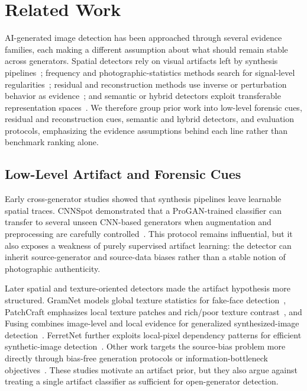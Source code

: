 \documentclass[lettersize,journal]{IEEEtran}
\begin{document}
\section{Related Work}
\label{sec:related_work}

AI-generated image detection has been approached through several evidence families, each making a different assumption about what should remain stable across generators. Spatial detectors rely on visual artifacts left by synthesis pipelines~\cite{wang2020cnnspot,liu2020gramnet,zhong2023patchcraft}; frequency and photographic-statistics methods search for signal-level regularities~\cite{frank2020frequency,liu2022realimages,zhong2025beyond}; residual and reconstruction methods use inverse or perturbation behavior as evidence~\cite{tan2023lgrad,tan2024npr,wang2023dire}; and semantic or hybrid detectors exploit transferable representation spaces~\cite{radford2021clip,ojha2023univfd,yan2025aide,cheng2025cospy}. We therefore group prior work into low-level forensic cues, residual and reconstruction cues, semantic and hybrid detectors, and evaluation protocols, emphasizing the evidence assumptions behind each line rather than benchmark ranking alone.

\subsection{Low-Level Artifact and Forensic Cues}
Early cross-generator studies showed that synthesis pipelines leave learnable spatial traces. CNNSpot demonstrated that a ProGAN-trained classifier can transfer to several unseen CNN-based generators when augmentation and preprocessing are carefully controlled~\cite{wang2020cnnspot}. This protocol remains influential, but it also exposes a weakness of purely supervised artifact learning: the detector can inherit source-generator and source-data biases rather than a stable notion of photographic authenticity.

Later spatial and texture-oriented detectors made the artifact hypothesis more structured. GramNet models global texture statistics for fake-face detection~\cite{liu2020gramnet}, PatchCraft emphasizes local texture patches and rich/poor texture contrast~\cite{zhong2023patchcraft}, and Fusing combines image-level and local evidence for generalized synthesized-image detection~\cite{ju2022fusing}. FerretNet further exploits local-pixel dependency patterns for efficient synthetic-image detection~\cite{liang2025ferretnet}. Other work targets the source-bias problem more directly through bias-free generation protocols or information-bottleneck objectives~\cite{guillaro2025biasfree,zhang2025vibnet}. These studies motivate an artifact prior, but they also argue against treating a single artifact classifier as sufficient for open-generator detection.
\end{document}
